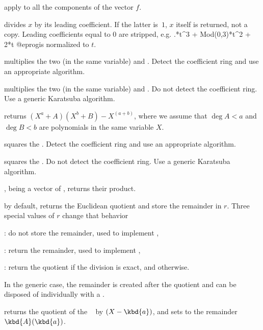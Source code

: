  apply 
to all the components of the vector $f$.

 divides $x$ by its
leading coefficient. If the latter is~$1$, $x$ itself is returned, not a
copy. Leading coefficients equal to $0$ are stripped, e.g.
.*t^3 + Mod(0,3)*t^2 + 2*t
@eprog\noindent is normalized to $t$.

 multiplies the two  (in the same
variable)  and . Detect the coefficient ring and use an
appropriate algorithm.

 multiplies the two  (in the same
variable)  and . Do not detect the coefficient ring.
Use a generic Karatsuba algorithm.

returns $(X^a + A)(X^b + B) - X^(a+b)$, where we assume that $\deg A < a$
and $\deg B < b$ are polynomials in the same variable $X$.

 squares the  . Detect the coefficient
ring and use an appropriate algorithm.

 squares the  . Do not detect the
coefficient ring.  Use a generic Karatsuba algorithm.

,  being a vector of ,
returns their product.

 by default, returns the Euclidean
quotient and store the remainder in $r$. Three special values of $r$ change
that behavior
\item {}: do not store the remainder, used to implement ,

\item {}: return the remainder, used to implement ,

\item {}: return the quotient if the division is exact, and
 otherwise.

In the generic case, the remainder is created after the quotient and can be
disposed of individually with a .


 returns the
quotient of the ~ by $(X - \kbd{a})$, and sets  to the
remainder $\kbd{A}(\kbd{a})$.


